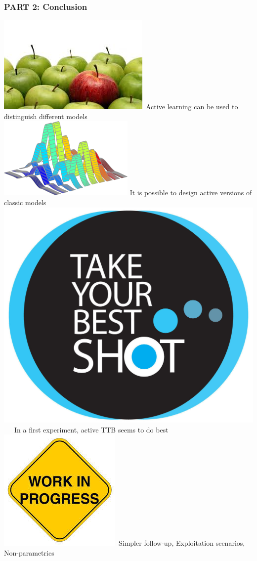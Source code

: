 \documentclass{beamer}
\begin{document}
\begin{frame}
 \frametitle{PART 2: Conclusion}
  \includegraphics[scale=0.12]{distinguish.jpeg}~Active learning can be used to distinguish different models \medskip\\
 \includegraphics[scale=0.6]{uncertain.png} It is possible to design active versions of classic models\medskip\\
\includegraphics[scale=0.07]{ttb.jpg}~~~In a first experiment, active TTB seems to do best\bigskip\\
 \includegraphics[scale=0.12]{workinprogress.jpeg}~Simpler follow-up, Exploitation scenarios, Non-parametrics
\end{frame}
\end{document}
